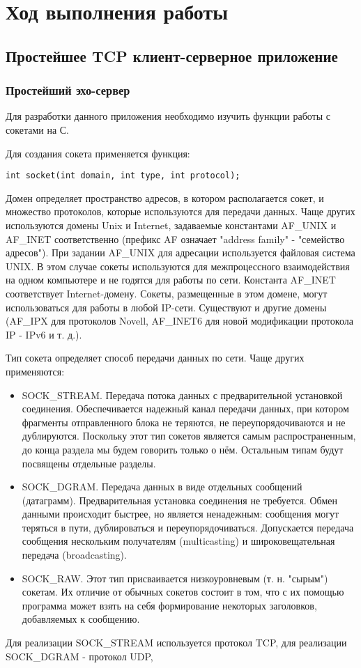 \section{Ход выполнения работы}

\subsection{Простейшее TCP клиент-серверное приложение}

\subsubsection{Простейший эхо-сервер}

Для разработки данного приложения необходимо изучить функции работы с сокетами на С.

Для создания сокета применяется функция:
\begin{lstlisting}
int socket(int domain, int type, int protocol);
\end{lstlisting}

Домен определяет пространство адресов, в котором располагается сокет, и множество протоколов, которые используются для передачи данных. Чаще других используются домены Unix и Internet, задаваемые константами AF\_UNIX и AF\_INET соответственно (префикс AF означает "address family" - "семейство адресов"). При задании AF\_UNIX для адресации используется файловая система UNIX. В этом случае сокеты используются для межпроцессного взаимодействия на одном компьютере и не годятся для работы по сети. Константа AF\_INET соответствует Internet-домену. Сокеты, размещенные в этом домене, могут использоваться для работы в любой IP-сети. Существуют и другие домены (AF\_IPX для протоколов Novell, AF\_INET6 для новой модификации протокола IP - IPv6 и т. д.).

Тип сокета определяет способ передачи данных по сети. Чаще других применяются:
\begin{itemize}
\item SOCK\_STREAM. Передача потока данных с предварительной установкой соединения. Обеспечивается надежный канал передачи данных, при котором фрагменты отправленного блока не теряются, не переупорядочиваются и не дублируются. Поскольку этот тип сокетов является самым распространенным, до конца раздела мы будем говорить только о нём. Остальным типам будут посвящены отдельные разделы.
\item SOCK\_DGRAM. Передача данных в виде отдельных сообщений (датаграмм). Предварительная установка соединения не требуется. Обмен данными происходит быстрее, но является ненадежным: сообщения могут теряться в пути, дублироваться и переупорядочиваться. Допускается передача сообщения нескольким получателям (multicasting) и широковещательная передача (broadcasting).
\item SOCK\_RAW. Этот тип присваивается низкоуровневым (т. н. "сырым") сокетам. Их отличие от обычных сокетов состоит в том, что с их помощью программа может взять на себя формирование некоторых заголовков, добавляемых к сообщению.
\end{itemize}
Для реализации SOCK\_STREAM используется протокол TCP, для реализации SOCK\_DGRAM - протокол UDP,

